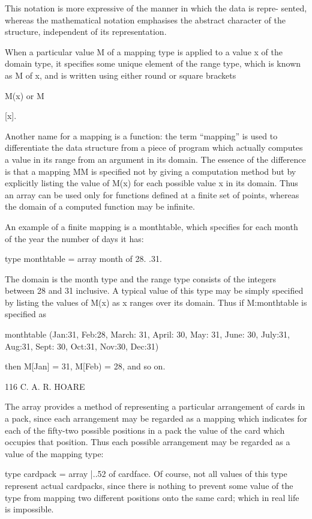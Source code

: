 {	This notation is more expressive of the manner in which the data is repre- sented, whereas the mathematical notation emphasises the abstract character of the structure, independent of its representation.
	
	When a particular value M of a mapping type is applied to a value x of the domain type, it specifies some unique element of the range type, which is known as M of x, and is written using either round or square brackets
	
	M(x) or M{[x].
		
		Another name for a mapping is a function: the term “mapping” is used to differentiate the data structure from a piece of program which actually computes a value in its range from an argument in its domain. The essence of the difference is that a mapping MM is specified not by giving a computation method but by explicitly listing the value of M(x) for each possible value x in its domain. Thus an array can be used only for functions defined at a finite set of points, whereas the domain of a computed function may be infinite.
		
		An example of a finite mapping is a monthtable, which specifies for each month of the year the number of days it has:
		
		type monthtable = array month of 28. .31.
		
		The domain is the month type and the range type consists of the integers between 28 and 31 inclusive. A typical value of this type may be simply specified by listing the values of M(x) as x ranges over its domain. Thus if M:monthtable is specified as
		
		monthtable (Jan:31, Feb:28, March: 31, April: 30, May: 31, June: 30, July:31, Aug:31, Sept: 30, Oct:31, Nov:30, Dec:31)
		
		then M[Jan] = 31, M[Feb) = 28, and so on.
		
		116 C. A. R. HOARE
		
		The array provides a method of representing a particular arrangement of cards in a pack, since each arrangement may be regarded as a mapping which indicates for each of the fifty-two possible positions in a pack the value of the card which occupies that position. Thus each possible arrangement may be regarded as a value of the mapping type:
		
		type cardpack = array |..52 of cardface. Of course, not all values of this type represent actual cardpacks, since there is nothing to prevent some value of the type from mapping two different positions onto the same card; which in real life is impossible.
		
}}

